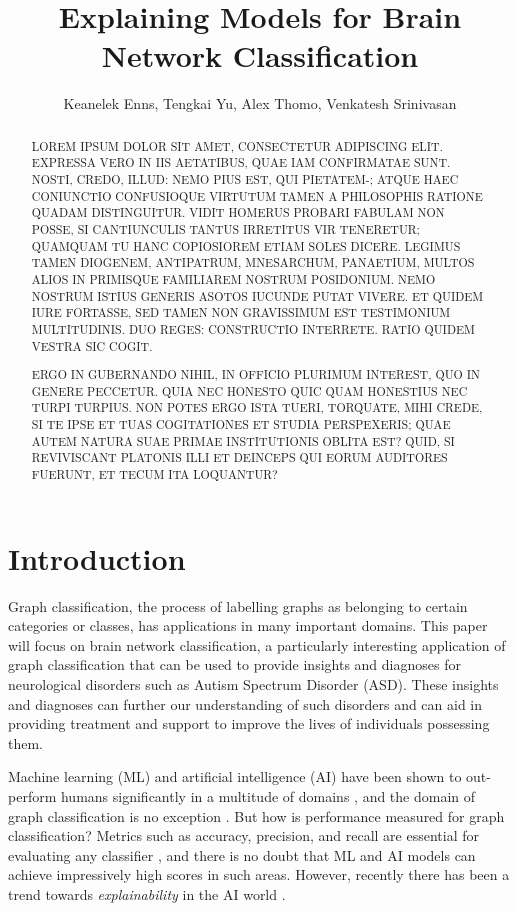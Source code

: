 \documentclass[letterpaper]{article}
\author{
Keanelek Enns, Tengkai Yu, Alex Thomo, Venkatesh Srinivasan\\
}
\title{Explaining Models for Brain Network Classification}
\begin{document}
\maketitle

\begin{abstract}
LOREM IPSUM DOLOR SIT AMET, CONSECTETUR ADIPISCING ELIT. EXPRESSA VERO IN IIS AETATIBUS, QUAE IAM CONFIRMATAE SUNT. NOSTI, CREDO, ILLUD: NEMO PIUS EST, QUI PIETATEM-; ATQUE HAEC CONIUNCTIO CONFUSIOQUE VIRTUTUM TAMEN A PHILOSOPHIS RATIONE QUADAM DISTINGUITUR. VIDIT HOMERUS PROBARI FABULAM NON POSSE, SI CANTIUNCULIS TANTUS IRRETITUS VIR TENERETUR; QUAMQUAM TU HANC COPIOSIOREM ETIAM SOLES DICERE. LEGIMUS TAMEN DIOGENEM, ANTIPATRUM, MNESARCHUM, PANAETIUM, MULTOS ALIOS IN PRIMISQUE FAMILIAREM NOSTRUM POSIDONIUM. NEMO NOSTRUM ISTIUS GENERIS ASOTOS IUCUNDE PUTAT VIVERE. ET QUIDEM IURE FORTASSE, SED TAMEN NON GRAVISSIMUM EST TESTIMONIUM MULTITUDINIS. DUO REGES: CONSTRUCTIO INTERRETE. RATIO QUIDEM VESTRA SIC COGIT.

ERGO IN GUBERNANDO NIHIL, IN OFFICIO PLURIMUM INTEREST, QUO IN GENERE PECCETUR. QUIA NEC HONESTO QUIC QUAM HONESTIUS NEC TURPI TURPIUS. NON POTES ERGO ISTA TUERI, TORQUATE, MIHI CREDE, SI TE IPSE ET TUAS COGITATIONES ET STUDIA PERSPEXERIS; QUAE AUTEM NATURA SUAE PRIMAE INSTITUTIONIS OBLITA EST? QUID, SI REVIVISCANT PLATONIS ILLI ET DEINCEPS QUI EORUM AUDITORES FUERUNT, ET TECUM ITA LOQUANTUR?
\end{abstract}

\section{Introduction}

Graph classification, the process of labelling graphs as belonging to certain categories or classes, has applications in many important domains.
This paper will focus on brain network classification, a particularly interesting application of graph classification that can be used to provide insights and diagnoses for neurological disorders such as Autism Spectrum Disorder (ASD).
These insights and diagnoses can further our understanding of such disorders and can aid in providing treatment and support to improve the lives of individuals possessing them.

Machine learning (ML) and artificial intelligence (AI) have been shown to out-perform humans significantly in a multitude of domains \cite{grace2018,fogel2018,brzezicki2020,kahng2021}, and the domain of graph classification is no exception \cite{kong2019}.
But how is performance measured for graph classification?
Metrics such as accuracy, precision, and recall are essential for evaluating any classifier \cite{elkan2012}, and there is no doubt that ML and AI models can achieve impressively high scores in such areas.
However, recently there has been a trend towards \emph{explainability} in the AI world \cite{hassan2021,linardatos2020}.
\end{document}
